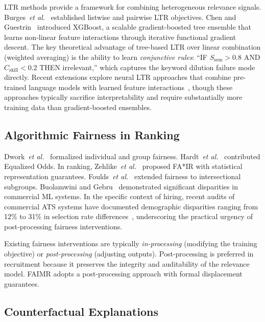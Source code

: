 \documentclass[smallcondensed,numbers]{sn-jnl}
\begin{document}
LTR methods provide a framework for combining heterogeneous relevance signals. Burges~\textit{et al.}~\cite{burges2005learning} established listwise and pairwise LTR objectives. Chen and Guestrin~\cite{chen2016xgboost} introduced XGBoost, a scalable gradient-boosted tree ensemble that learns non-linear feature interactions through iterative functional gradient descent. The key theoretical advantage of tree-based LTR over linear combination (weighted averaging) is the ability to learn \textit{conjunctive rules}: ``IF $S_\text{sem} > 0.8$ AND $C_\text{skill} < 0.2$ THEN irrelevant,'' which captures the keyword dilution failure mode directly. Recent extensions explore neural LTR approaches that combine pre-trained language models with learned feature interactions~\cite{chen2023automated}, though these approaches typically sacrifice interpretability and require substantially more training data than gradient-boosted ensembles.

\subsection{Algorithmic Fairness in Ranking}

Dwork~\textit{et al.}~\cite{dwork2012fairness} formalized individual and group fairness. Hardt~\textit{et al.}~\cite{hardt2016equality} contributed Equalized Odds. In ranking, Zehlike~\textit{et al.}~\cite{zehlike2017fa} proposed FA*IR with statistical representation guarantees. Foulds~\textit{et al.}~\cite{foulds2020intersectional} extended fairness to intersectional subgroups. Buolamwini and Gebru~\cite{buolamwini2018gender} demonstrated significant disparities in commercial ML systems. In the specific context of hiring, recent audits of commercial ATS systems have documented demographic disparities ranging from 12\% to 31\% in selection rate differences~\cite{raghavan2020mitigating}, underscoring the practical urgency of post-processing fairness interventions.

Existing fairness interventions are typically \textit{in-processing} (modifying the training objective) or \textit{post-processing} (adjusting outputs). Post-processing is preferred in recruitment because it preserves the integrity and auditability of the relevance model. FAIMR adopts a post-processing approach with formal displacement guarantees.

\subsection{Counterfactual Explanations}
\end{document}
